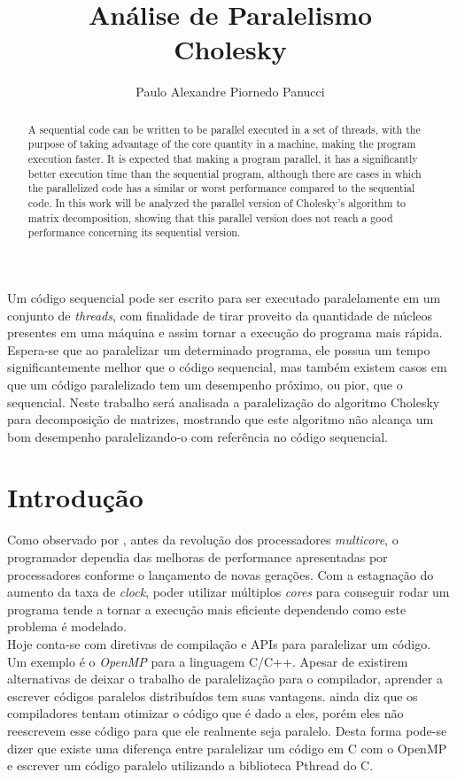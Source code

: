 \documentclass[12pt]{article}
\title{Análise de Paralelismo\\ Cholesky}
\author{Paulo Alexandre Piornedo Panucci\inst{1}}
\newcommand\tab[1][1cm]{\hspace*{#1}}
\begin{document}
 

\maketitle

\begin{abstract}
A sequential code can be written to be parallel executed in a set of threads, with the purpose of taking advantage of the core quantity in a machine, making the program execution faster. It is expected that making a program parallel, it has a significantly better execution time than the sequential program, although there are cases in which the parallelized code has a similar or worst performance compared to the sequential code. In this work will be analyzed the parallel version of Cholesky's algorithm to matrix decomposition, showing that this parallel version does not reach a good performance concerning its sequential version. 
\end{abstract}
     
\begin{resumo}
Um código sequencial pode ser escrito para ser executado paralelamente em um conjunto de \textit{threads}, com finalidade de tirar proveito da quantidade de núcleos presentes em uma máquina e assim tornar a execução do programa mais rápida. Espera-se que ao paralelizar um determinado programa, ele possua um tempo significantemente melhor que o código sequencial, mas também existem casos em que um código paralelizado tem um desempenho próximo, ou pior, que o sequencial. Neste trabalho será analisada a paralelização do algoritmo Cholesky para decomposição de matrizes, mostrando que este algoritmo não alcança um bom desempenho paralelizando-o com referência no código sequencial.  
\end{resumo}


\section{Introdução}\label{sec:intro}

\tab Como observado por \cite{aubanel:1606499}, antes da revolução dos processadores \textit{multicore}, o programador dependia das melhoras de performance apresentadas por processadores conforme o lançamento de novas gerações. Com a estagnação do aumento da taxa de \textit{clock}, poder utilizar múltiplos \textit{cores}  para conseguir rodar um programa tende a tornar a execução mais eficiente dependendo como este problema é modelado.
\\
\tab Hoje conta-se com diretivas de compilação e APIs para paralelizar um código. Um exemplo é o \textit{OpenMP} para a linguagem C/C++. Apesar de existirem alternativas de deixar o trabalho de paralelização para o compilador, aprender a escrever códigos paralelos distribuídos tem suas vantagens. \cite{aubanel:1606499} ainda diz que os compiladores tentam otimizar o código que é dado a eles, porém eles não reescrevem esse código para que ele realmente seja paralelo. Desta forma pode-se dizer que existe uma diferença entre paralelizar um código em C com o OpenMP e escrever um código paralelo utilizando a biblioteca Pthread do C.
\end{document}

